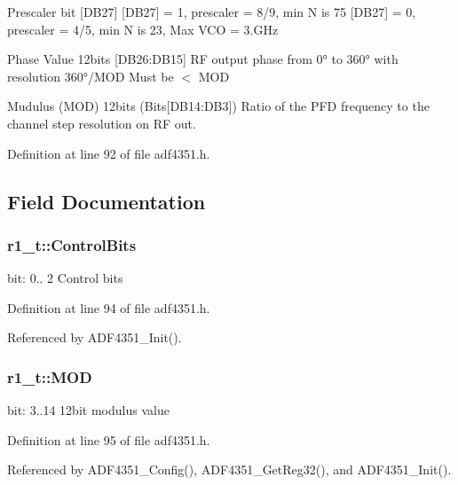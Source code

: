 Prescaler bit \mbox{[}D\+B27\mbox{]} \mbox{[}D\+B27\mbox{]} = 1, prescaler = 8/9, min N is 75 \mbox{[}D\+B27\mbox{]} = 0, prescaler = 4/5, min N is 23, Max V\+CO = 3.\+G\+Hz

Phase Value 12bits \mbox{[}D\+B26\+:D\+B15\mbox{]} RF output phase from 0° to 360° with resolution 360°/\+M\+OD Must be $<$ M\+OD

Mudulus (M\+OD) 12bits (Bits\mbox{[}D\+B14\+:D\+B3\mbox{]}) Ratio of the P\+FD frequency to the channel step resolution on RF out. 

Definition at line 92 of file adf4351.\+h.



\subsection{Field Documentation}
\subsubsection[{\texorpdfstring{Control\+Bits}{ControlBits}}]{ r1\+\_\+t\+::\+Control\+Bits}\hypertarget{structr1__t_a5335bbd53d06ad7afb879d919033404c}{}\label{structr1__t_a5335bbd53d06ad7afb879d919033404c}
bit\+: 0.. 2 Control bits 

Definition at line 94 of file adf4351.\+h.



Referenced by A\+D\+F4351\+\_\+\+Init().

\subsubsection[{\texorpdfstring{M\+OD}{MOD}}]{ r1\+\_\+t\+::\+M\+OD}\hypertarget{structr1__t_a9ea14fcf64bbacfbcfa5afa992c0b87d}{}\label{structr1__t_a9ea14fcf64bbacfbcfa5afa992c0b87d}
bit\+: 3..14 12bit modulus value 

Definition at line 95 of file adf4351.\+h.



Referenced by A\+D\+F4351\+\_\+\+Config(), A\+D\+F4351\+\_\+\+Get\+Reg32(), and A\+D\+F4351\+\_\+\+Init().

